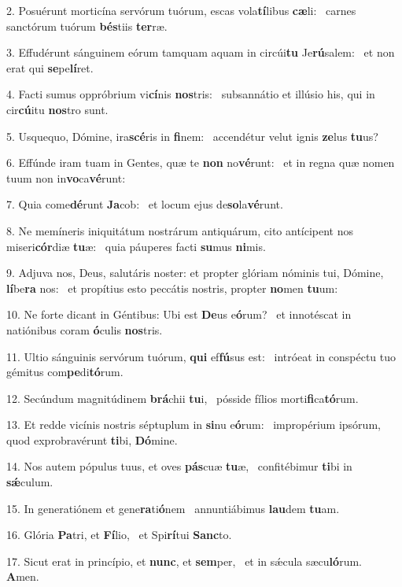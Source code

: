 2. Posuérunt morticína servórum tuórum, escas vola\textbf{tí}libus \textbf{cæ}li: \ast\  carnes sanctórum tuórum \textbf{bés}tiis \textbf{ter}ræ.\

3. Effudérunt sánguinem eórum tamquam aquam in circúi\textbf{tu} Je\textbf{rú}salem: \ast\  et non erat qui \textbf{se}pe\textbf{lí}ret.\

4. Facti sumus oppróbrium vi\textbf{cí}nis \textbf{nos}tris: \ast\  subsannátio et illúsio his, qui in cir\textbf{cú}itu \textbf{nos}tro sunt.\

5. Usquequo, Dómine, ira\textbf{scé}ris in \textbf{fi}nem: \ast\  accendétur velut ignis \textbf{ze}lus \textbf{tu}us?\

6. Effúnde iram tuam in Gentes, quæ te \textbf{non} no\textbf{vé}runt: \ast\  et in regna quæ nomen tuum non in\textbf{vo}ca\textbf{vé}runt:\

7. Quia come\textbf{dé}runt \textbf{Ja}cob: \ast\  et locum ejus de\textbf{so}la\textbf{vé}runt.\

8. Ne memíneris iniquitátum nostrárum antiquárum, cito antícipent nos miseri\textbf{cór}diæ \textbf{tu}æ: \ast\  quia páuperes facti \textbf{su}mus \textbf{ni}mis.\

9. Adjuva nos, Deus, salutáris noster: et propter glóriam nóminis tui, Dómine, \textbf{lí}be\textbf{ra} nos: \ast\  et propítius esto peccátis nostris, propter \textbf{no}men \textbf{tu}um:\

10. Ne forte dicant in Géntibus: Ubi est \textbf{De}us e\textbf{ó}rum? \ast\  et innotéscat in natiónibus coram \textbf{ó}culis \textbf{nos}tris.\

11. Ultio sánguinis servórum tuórum, \textbf{qui} ef\textbf{fú}sus est: \ast\  intróeat in conspéctu tuo gémitus com\textbf{pe}di\textbf{tó}rum.\

12. Secúndum magnitúdinem \textbf{brá}chii \textbf{tu}i, \ast\  pósside fílios morti\textbf{fi}ca\textbf{tó}rum.\

13. Et redde vicínis nostris séptuplum in \textbf{si}nu e\textbf{ó}rum: \ast\  impropérium ipsórum, quod exprobravérunt \textbf{ti}bi, \textbf{Dó}mine.\

14. Nos autem pópulus tuus, et oves \textbf{pás}cuæ \textbf{tu}æ, \ast\  confitébimur \textbf{ti}bi in \textbf{sǽ}culum.\

15. In generatiónem et gene\textbf{ra}ti\textbf{ó}nem \ast\  annuntiábimus \textbf{lau}dem \textbf{tu}am.\

16. Glória \textbf{Pa}tri, et \textbf{Fí}lio, \ast\  et Spi\textbf{rí}tui \textbf{Sanc}to.\

17. Sicut erat in princípio, et \textbf{nunc}, et \textbf{sem}per, \ast\  et in sǽcula sæcu\textbf{ló}rum. \textbf{A}men.\

